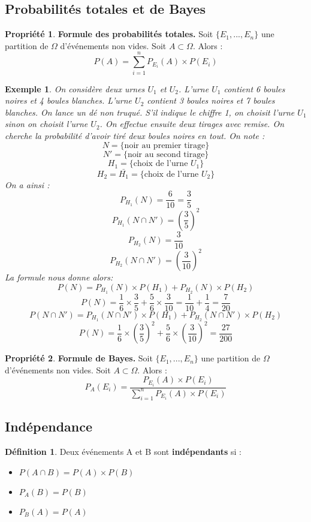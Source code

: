\documentclass[a4paper,12pt]{article}
\newtheorem{Ex}{Exemple}[section]
\theoremstyle{theorem}
\theoremstyle{definition}
\newtheorem{Propriete}{Propriété}[section]
\theoremstyle{definition}
\theoremstyle{definition}
\newtheorem{Def}{Définition}[section]
\begin{document}
	\subsection{Probabilités totales et de Bayes}
		\begin{Propriete}
			\textbf{Formule des probabilités totales.} Soit $\{E_{1},...,E_{n}\}$ une partition de $\Omega$ d'événements non vides. Soit $A\subset \Omega$. Alors :
			\[P(A) = \sum_{i=1}^{n} P_{E_{i}}(A) \times P(E_{i})\]
		\end{Propriete}
		
		\begin{Ex}
			On considère deux urnes $U_{1}$ et $U_{2}$. L'urne $U_{1}$ contient 6 boules noires et 4 boules blanches. L'urne $U_{2}$ contient 3 boules noires et 7 boules blanches. On lance un dé non truqué. S'il indique le chiffre 1, on choisit l'urne $U_{1}$ sinon on choisit l'urne $U_{2}$. On effectue ensuite deux tirages avec remise. On cherche la probabilité d'avoir tiré deux boules noires en tout. On note :
			\[N = \{\text{noir au premier tirage}\}\]
			\[N' = \{\text{noir au second tirage}\}\]
			\[H_{1} = \{\text{choix de l'urne $U_{1}$}\}\]
			\[H_{2} = \bar{H_{1}} = \{\text{choix de l'urne $U_{2}$}\}\]
			On a ainsi :
			\[P_{H_{1}}(N) = \frac{6}{10} = \frac{3}{5}\]
			\[P_{H_{1}}(N\cap N') = (\frac{3}{5})^{2}\]
			\[P_{H_{2}}(N) = \frac{3}{10}\]
			\[P_{H_{2}}(N\cap N') = (\frac{3}{10})^{2}\]
			La formule nous donne alors:
			\[P(N) = P_{H_{1}}(N) \times P(H_{1}) + P_{H_{2}}(N) \times P(H_{2})\]
			\[P(N) = \frac{1}{6} \times \frac{3}{5} + \frac{5}{6} \times \frac{3}{10} = \frac{1}{10} + \frac{1}{4} = \frac{7}{20}\]
			\[P(N\cap N') = P_{H_{1}}(N\cap N') \times P(H_{1}) + P_{H_{2}}(N\cap N') \times P(H_{2})\]
			\[P(N) = \frac{1}{6} \times (\frac{3}{5})^{2} + \frac{5}{6} \times (\frac{3}{10})^{2} = \frac{27}{200}\]
			
		\end{Ex}
	
		\begin{Propriete}
			\textbf{Formule de Bayes.} Soit $\{E_{1},...,E_{n}\}$ une partition de $\Omega$ d'événements non vides. Soit $A\subset \Omega$. Alors : 
			\[P_{A}(E_{i}) = \frac{P_{E_{i}}(A) \times P(E_{i})}{\sum_{i=1}^{n}P_{E_{i}}(A) \times P(E_{i}) }\]
		\end{Propriete}
	
	\subsection{Indépendance}
		\begin{Def}
			Deux événements A et B sont \textbf{indépendants} si : \\
			\begin{itemize}
				\item $P(A\cap B) = P(A) \times P(B)$
				\item $P_{A}(B) = P(B)$
				\item $P_{B}(A) = P(A)$
			\end{itemize}
		\end{Def}
	
\end{document}
